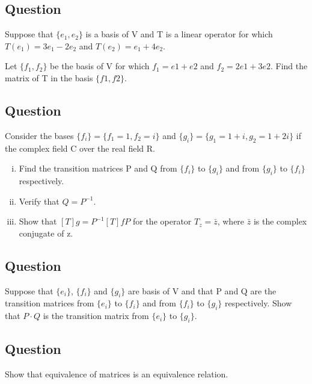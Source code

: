 \documentclass{book}
\begin{document}
\subsection{Question}

Suppose that \(\{e_1, e_2\}\) is a basis of V and T is a linear operator for which \(T(e_1) = 3e_1 - 2e_2\) and \(T(e_2) = e_1 + 4e_2\).

Let \(\{f_1, f_2\}\) be the basis of V for which \(f_1 = e1 + e2\) and \(f_2 = 2e1 + 3e2\). Find the matrix of T in the basis \(\{f1, f2\}\).

\subsection{Question}

Consider the bases \(\{f_i\} = \{f_1 = 1, f_2 = i\}\) and \(\{g_i\} = \{g_1 = 1 + i, g_2 = 1 + 2i\}\) if the complex field C over the real field R.

\begin{enumerate}[i.]
	\item Find the transition matrices P and Q from \(\{f_i\}\) to \(\{g_i\}\) and from \(\{g_i\}\) to \(\{f_i\}\) respectively.
	\item Verify that \(Q = P^{-1}\).
	\item Show that \({[T]}g = P^{-1} {[T]}f P\) for the operator \(T_z = \bar z\), where \(\bar z\) is the complex conjugate of z.
\end{enumerate}

\subsection{Question}

Suppose that \(\{e_i\}\), \(\{f_i\}\) and \(\{g_i\}\) are basis of V and that P and Q are the transition matrices from \(\{e_i\}\) to \(\{f_i\}\) and from \(\{f_i\}\) to \(\{g_i\}\) respectively. Show that \(P \cdot Q\) is the transition matrix from \(\{e_i\}\) to \(\{g_i\}\).

\subsection{Question}

Show that equivalence of matrices is an equivalence relation.
\end{document}
